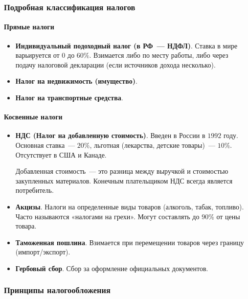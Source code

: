 \documentclass[12pt]{article}
\begin{document}
	\subsubsection{Подробная классификация налогов}
	
	\paragraph{Прямые налоги}
	
	\begin{itemize}
		\item \textbf{Индивидуальный подоходный налог (в РФ~--- НДФЛ)}. Ставка в мире варьируется от $0$ до $60\%$. Взимается либо по месту работы, либо через подачу налоговой декларации (если источников дохода несколько).
		\item \textbf{Налог на недвижимость (имущество)}.
		\item \textbf{Налог на транспортные средства}.
	\end{itemize}
	
	\paragraph{Косвенные налоги}
	
	\begin{itemize}
		\item \textbf{НДС (Налог на добавленную стоимость)}. Введен в России в $1992$ году. Основная ставка~--- $20\%$, льготная (лекарства, детские товары)~--- $10\%$. Отсутствует в США и Канаде. 
		\begin{note}
			Добавленная стоимость~--- это разница между выручкой и стоимостью закупленных материалов. Конечным плательщиком НДС всегда является потребитель.
		\end{note}
		\item \textbf{Акцизы}. Налоги на определенные виды товаров (алкоголь, табак, топливо). Часто называются «налогами на грехи». Могут составлять до $90\%$ от цены товара.
		\item \textbf{Таможенная пошлина}. Взимается при перемещении товаров через границу (импорт/экспорт).
		\item \textbf{Гербовый сбор}. Сбор за оформление официальных документов.
	\end{itemize}
	
	\subsubsection{Принципы налогообложения}
	
\end{document}
